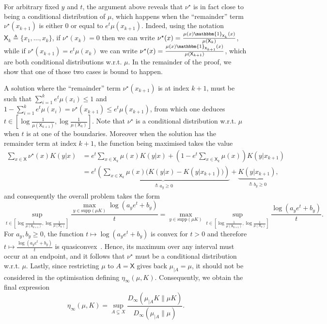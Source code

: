 \documentclass[conference,letterpaper]{IEEEtran}
\def \X{\mathsf X}
\def \supp {\mathrm{supp}}
\begin{document}
    For arbitrary fixed $y$ and $t$, the argument above reveals that $\nu^\star$ is in fact close to being a conditional distribution of $\mu$, which happens when the ``remainder'' term $\nu^\star(x_{k+1})$ is either 0 or equal to $e^t\mu(x_{k+1})$. Indeed, using the notation $\X_k\triangleq\{x_1, \dots, x_k\}$, if $\nu^\star(x_k)=0$ then we can write $\nu^\star(x)=\frac{\mu(x)\mathbbm{1}_{\X_k}(x)}{\mu(\X_k)}$, while if $\nu^\star(x_{k+1})=e^t\mu(x_k)$ we can write $\nu^\star(x)=\frac{\mu(x)\mathbbm{1}_{\X_{k+1}}(x)}{\mu(\X_{k+1})}$, which are both conditional distributions w.r.t. $\mu$. In the remainder of the proof, we show that one of those two cases is bound to happen.
    
    A solution where the ``remainder'' term $\nu^\star(x_{k+1})$ is at index $k+1$, must be such that $\sum_{i=1}^k e^t\mu(x_i) \leq 1$ and $1-\sum_{i=1}^k e^t\mu(x_i)=\nu^\star(x_{k+1})\leq e^t\mu(x_{k+1})$, from which one deduces $t\in\left[\log\frac1{\mu(\X_{k+1})}, \log\frac1{\mu(\X_k)}\right]$. Note that $\nu^\star$ is a conditional distribution w.r.t. $\mu$ when $t$ is at one of the boundaries. Moreover when the solution has the remainder term at index $k+1$, the function being maximised takes the value
    \begin{align*}
        \sum_{x\in\X}  \nu^\star(x)K(y|x) &= e^t\sum_{x\in\X_k}\mu(x)K(y|x) + \left(1-e^t\sum_{x\in\X_k}\mu(x)\right)K(y|x_{k+1})\\
        &=e^t\underbrace{\left(\sum_{x\in\X_k}\mu(x)\big(K(y|x)-K(y|x_{k+1})\big)\right)}_{\triangleq a_y\geq 0}+\underbrace{K(y|x_{k+1})}_{\triangleq b_y\geq 0},
    \end{align*}
    and consequently the overall problem takes the form
    \begin{equation*}
        \sup_{t\in\left[\log\frac1{\mu(\X_{k+1})}, \log\frac1{\mu(\X_k)}\right]}\frac{\max_{y\in\supp(\mu K)}\log(a_y e^t+b_y)}{t} = \max_{y\in\supp(\mu K)}\sup_{t\in\left[\log\frac1{\mu(\X_{k+1})}, \log\frac1{\mu(\X_k)}\right]}\frac{\log(a_y e^t+b_y)}{t}.
    \end{equation*}
    For $a_y, b_y\geq 0$, the function $t\mapsto \log(a_y e^t+b_y)$ is convex for $t>0$ and therefore $t\mapsto\frac{\log(a_y e^t+b_y)}{t}$ is quasiconvex~\cite[Example 3.38]{boyd2004convex}. Hence, its maximum over any interval must occur at an endpoint, and it follows that $\nu^\star$ must be a conditional distribution w.r.t. $\mu$. Lastly, since restricting $\mu$ to $A=\X$ gives back $\mu_{|A}=\mu$, it should not be considered in the optimisation defining $\eta_\infty(\mu, K)$. Consequently, we obtain the final expression
    \begin{equation*}
        \eta_\infty(\mu, K) = \sup_{A\subsetneq X}\frac{D_\infty\left(\mu_{|A} K\|\mu K\right)}{D_\infty\left(\mu_{|A}\|\mu\right)}.
    \end{equation*}
\end{document}
